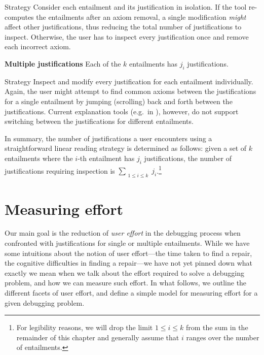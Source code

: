 \begin{compactenum}
\begin{compactenum}
\begin{compactdesc}
\item[Strategy] Consider each entailment and its justification in isolation. If the tool re-computes the entailments after an axiom removal, a single modification \emph{might} affect other justifications, thus reducing the total number of justifications to inspect. Otherwise, the user has to inspect every justification once and remove each incorrect axiom.
\end{compactdesc}


\item \textbf{Multiple justifications} Each of the $k$ entailments has $j_{i}$ justifications.

\begin{compactdesc}
\item[Strategy] Inspect and modify every justification for each entailment individually. Again, the user might attempt to find common axioms between the justifications for a single entailment by jumping (scrolling) back and forth between the justifications. Current explanation tools (e.g.\ in \protege), however, do not support switching between the justifications for different entailments.
\end{compactdesc}

\end{compactenum}

\end{compactenum}

In summary, the number of justifications a user encounters using a straightforward linear reading strategy is determined as follows: given a set of $k$ entailments where the $i$-th entailment has $j_{i}$ justifications, the number of justifications requiring inspection is $\sum\limits_{\substack{1\leq i\leq k}} j_{i}$.\footnote{For legibility reasons, we will drop the limit $1\leq i\leq k$ from the sum in the remainder of this chapter and generally assume that $i$ ranges over the number of entailments.}


\section{Measuring effort}

Our main goal is the reduction of \emph{user effort} in the debugging process when confronted with justifications for single or multiple entailments. While we have some intuitions about the notion of user effort---the time taken to find a repair, the cognitive difficulties in finding a repair---we have not yet pinned down what exactly we mean when we talk about the effort required to solve a debugging problem, and how we can measure such effort. In what follows, we outline the different facets of user effort, and define a simple model for measuring effort for a given debugging problem.

